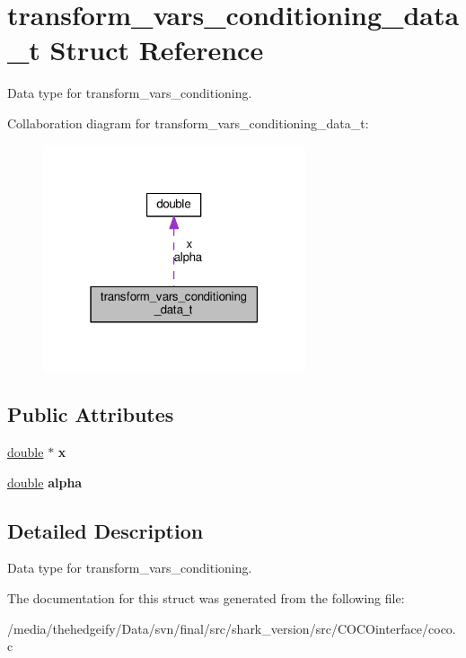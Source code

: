 \hypertarget{structtransform__vars__conditioning__data__t}{}\section{transform\+\_\+vars\+\_\+conditioning\+\_\+data\+\_\+t Struct Reference}
\label{structtransform__vars__conditioning__data__t}


Data type for transform\+\_\+vars\+\_\+conditioning.  




Collaboration diagram for transform\+\_\+vars\+\_\+conditioning\+\_\+data\+\_\+t\+:\nopagebreak
\begin{figure}[H]
\begin{center}
\leavevmode
\includegraphics[width=219pt]{structtransform__vars__conditioning__data__t__coll__graph}
\end{center}
\end{figure}
\subsection*{Public Attributes}
\begin{DoxyCompactItemize}
\item 
\hyperlink{classdouble}{double} $\ast$ {\bfseries x}\hypertarget{structtransform__vars__conditioning__data__t_af7d7c045897682819962e8fccd9845c4}{}\label{structtransform__vars__conditioning__data__t_af7d7c045897682819962e8fccd9845c4}

\item 
\hyperlink{classdouble}{double} {\bfseries alpha}\hypertarget{structtransform__vars__conditioning__data__t_a56ef323234504b16ba92e7d217509170}{}\label{structtransform__vars__conditioning__data__t_a56ef323234504b16ba92e7d217509170}

\end{DoxyCompactItemize}


\subsection{Detailed Description}
Data type for transform\+\_\+vars\+\_\+conditioning. 

The documentation for this struct was generated from the following file\+:\begin{DoxyCompactItemize}
\item 
/media/thehedgeify/\+Data/svn/final/src/shark\+\_\+version/src/\+C\+O\+C\+Ointerface/coco.\+c\end{DoxyCompactItemize}

